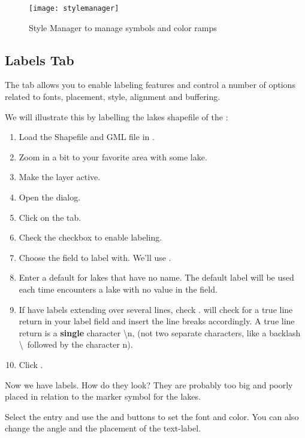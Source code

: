 \begin{figure}[ht]
   \centering
   \texttt{[image: stylemanager]}
   \caption{Style Manager to manage symbols and color ramps \nixcaption}\label{fig:stylemanager}   
\end{figure}

\subsection{Labels Tab}

The  tab allows you to enable labeling features and control a number of
options related to fonts, placement, style, alignment and buffering.

We will illustrate this by labelling the lakes shapefile of the
:

\begin{enumerate}
\item Load the Shapefile  and GML file  in \qg.
\item Zoom in a bit to your favorite area with some lake.
\item Make the  layer active.
\item Open the  dialog.
\item Click on the  tab.
\item Check the  checkbox to enable labeling.
\item Choose the field to label with. 
  We'll use .
\item Enter a default for lakes that have no name. The default label will be
  used each time \qg encounters a lake with no value in the 
field.
\item If have labels extending over several lines, check . \qg will check for a true line return in your label field and
insert the line breaks accordingly. A true line return is a \textbf{single}
character \textbackslash n, (not two separate characters, like a backlash
\textbackslash ~followed by the character n).
\item Click .
\end{enumerate} 

Now we have labels. How do they look? They are probably too big and poorly
placed in relation to the marker symbol for the lakes.

Select the  entry and use the  and 
buttons to set the font and color. You can also change the angle and the
placement of the text-label.

